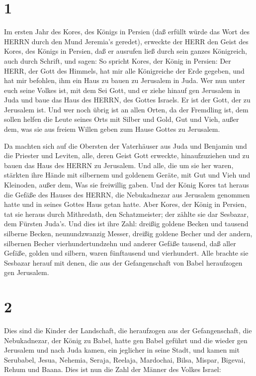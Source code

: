 \hypertarget{section}{%
\section{1}\label{section}}

 Im ersten Jahr des Kores, des Königs in Persien (daß
erfüllt würde das Wort des HERRN durch den Mund Jeremia's geredet),
erweckte der HERR den Geist des Kores, des Königs in Persien, daß er
ausrufen ließ durch sein ganzes Königreich, auch durch Schrift, und
sagen:  So spricht Kores, der König in Persien: Der HERR,
der Gott des Himmels, hat mir alle Königreiche der Erde gegeben, und hat
mir befohlen, ihm ein Haus zu bauen zu Jerusalem in Juda. 
Wer nun unter euch seine Volkes ist, mit dem Sei Gott, und er ziehe
hinauf gen Jerusalem in Juda und baue das Haus des HERRN, des Gottes
Israels. Er ist der Gott, der zu Jerusalem ist.  Und wer
noch übrig ist an allen Orten, da der Fremdling ist, dem sollen helfen
die Leute seines Orts mit Silber und Gold, Gut und Vieh, außer dem, was
sie aus freiem Willen geben zum Hause Gottes zu Jerusalem.

 Da machten sich auf die Obersten der Vaterhäuser aus Juda
und Benjamin und die Priester und Leviten, alle, deren Geist Gott
erweckte, hinaufzuziehen und zu bauen das Haus des HERRN zu Jerusalem.
 Und alle, die um sie her waren, stärkten ihre Hände mit
silbernem und goldenem Geräte, mit Gut und Vieh und Kleinoden, außer
dem, Was sie freiwillig gaben.  Und der König Kores tat
heraus die Gefäße des Hauses des HERRN, die Nebukadnezar aus Jerusalem
genommen hatte und in seines Gottes Haus getan hatte.  Aber
Kores, der König in Persien, tat sie heraus durch Mithredath, den
Schatzmeister; der zählte sie dar Sesbazar, dem Fürsten Juda's.
 Und dies ist ihre Zahl: dreißig goldene Becken und tausend
silberne Becken, neunundzwanzig Messer,  dreißig goldene
Becher und der andern, silbernen Becher vierhundertundzehn und anderer
Gefäße tausend,  daß aller Gefäße, golden und silbern,
waren fünftausend und vierhundert. Alle brachte sie Sesbazar herauf mit
denen, die aus der Gefangenschaft von Babel heraufzogen gen Jerusalem.

\hypertarget{section-1}{%
\section{2}\label{section-1}}

 Dies sind die Kinder der Landschaft, die heraufzogen aus
der Gefangenschaft, die Nebukadnezar, der König zu Babel, hatte gen
Babel geführt und die wieder gen Jerusalem und nach Juda kamen, ein
jeglicher in seine Stadt,  und kamen mit Serubabel, Jesua,
Nehemia, Seraja, Reelaja, Mardochai, Bilsa, Mispar, Bigevai, Rehum und
Baana. Dies ist nun die Zahl der Männer des Volkes Israel:

